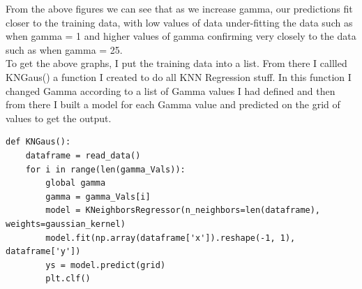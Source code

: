 \documentclass[11pt]{article} %
\begin{document}
\begin{figure}[h]
\qquad
{}
\end{figure}
From the above figures we can see that as we increase gamma, our predictions fit closer to the training data,  with low values of data under-fitting the data such as when gamma = 1 and higher values of gamma confirming very closely to the data such as when gamma = 25.\\
To get the above graphs, I put the training data into a list. From there I callled KNGaus() a function I created to do all KNN Regression stuff. In this function I changed Gamma according to a list of Gamma values I had defined and then from there I built a model for each Gamma value and predicted on the grid of values to get the output. 
\begin{verbatim}
def KNGaus():
    dataframe = read_data()
    for i in range(len(gamma_Vals)):
        global gamma
        gamma = gamma_Vals[i]
        model = KNeighborsRegressor(n_neighbors=len(dataframe), weights=gaussian_kernel)
        model.fit(np.array(dataframe['x']).reshape(-1, 1), dataframe['y'])
        ys = model.predict(grid)
        plt.clf()
\end{verbatim}
\end{document}
